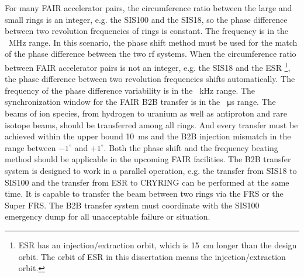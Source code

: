 For many FAIR accelerator pairs, the circumference ratio between the large and small rings is an integer, e.g. the SIS100 and the SIS18, so the phase difference between two revolution frequencies of rings is constant. The frequency is in the \SI{}{MHz} range. In this scenario, the phase shift method must be used for the match of the phase difference between the two rf systems. When the circumference ratio between FAIR accelerator pairs is not an integer, e.g. the SIS18 and the ESR \footnote{ESR has an injection/extraction orbit, which is \SI{15}{cm} longer than the design orbit. The orbit of ESR in this dissertation means the injection/extraction orbit.}, the phase difference between two revolution frequencies shifts automatically. The frequency of the phase difference variability is in the \SI{}{kHz} range. The synchronization window for the FAIR B2B transfer is in the \SI{}{\micro\second} range. The beams of ion species, from hydrogen to uranium as well as antiproton and rare isotope beams, should be transferred among all rings. And every transfer must be achieved within the upper bound \SI{10}{ms} and the B2B injection mismatch in the range between $-1^\circ$ and $+1^\circ$. Both the phase shift and the frequency beating method should be applicable in the upcoming FAIR facilities. The B2B transfer system is designed to work in a parallel operation, e.g. the transfer from SIS18 to SIS100 and the transfer from ESR to CRYRING can be performed at the same time. It is capable to transfer the beam between two rings via the FRS or the Super FRS. The B2B transfer system must coordinate with the SIS100 emergency dump for all unacceptable failure or situation. 


